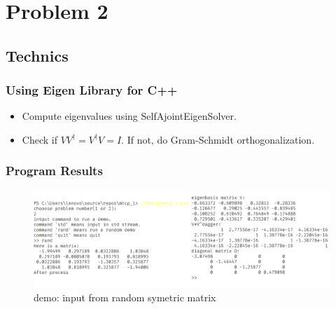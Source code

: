 \section{Problem 2}
\subsection{Technics}

    \begin{frame}
        \frametitle{Using Eigen Library for C++}

        \begin{itemize}
            \item Compute eigenvalues using SelfAjointEigenSolver.
            \item Check if \(VV^\dagger = V^\dagger V = I\). If not, do Gram-Schmidt orthogonalization.
        \end{itemize}

    \end{frame}

    \begin{frame}
    \frametitle{Program Results}
    
    \begin{figure}
        \centering
        \includegraphics[width = 1.7\textheight]{img/result2.png}
        \caption{demo: input from random symetric matrix}
        \end{figure}
\end{frame}
